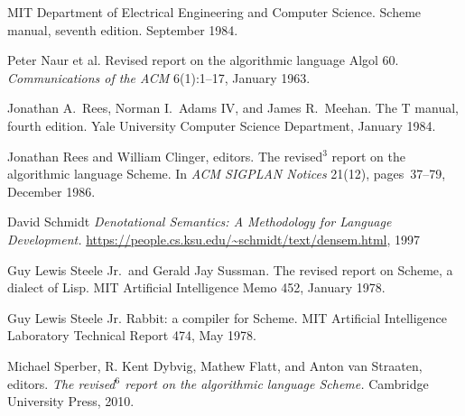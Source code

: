 \begin{thebibliography}{999}
MIT Department of Electrical Engineering and Computer Science.
Scheme manual, seventh edition.
September 1984.

Peter Naur et al.
Revised report on the algorithmic language Algol 60.
{\em Communications of the ACM} 6(1):1--17, January 1963.



Jonathan A.~Rees, Norman I.~Adams IV, and James R.~Meehan.
The T manual, fourth edition.
Yale University Computer Science Department, January 1984.

Jonathan Rees and William Clinger, editors.
The revised$^3$ report on the algorithmic language Scheme.
In {\em ACM SIGPLAN Notices} 21(12), pages~37--79, December 1986.


  David Schmidt
  {\em Denotational Semantics: A Methodology for Language Development.}
  \url{https://people.cs.ksu.edu/~schmidt/text/densem.html}, 1997


Guy Lewis Steele Jr.~and Gerald Jay Sussman.
The revised report on Scheme, a dialect of Lisp.
MIT Artificial Intelligence Memo 452, January 1978.

Guy Lewis Steele Jr.
Rabbit: a compiler for Scheme.
MIT Artificial Intelligence Laboratory Technical Report 474, May 1978.

Michael Sperber, R. Kent Dybvig, Mathew Flatt, and Anton van Straaten, editors.
{\em The revised$^6$ report on the algorithmic language Scheme.}
Cambridge University Press, 2010.


\end{thebibliography}
